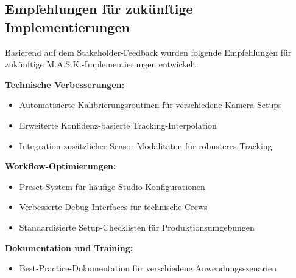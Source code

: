 \subsection{Empfehlungen für zukünftige Implementierungen}

Basierend auf dem Stakeholder-Feedback wurden folgende Empfehlungen für zukünftige M.A.S.K.-Implementierungen entwickelt:

\textbf{Technische Verbesserungen:}
\begin{itemize}
    \item Automatisierte Kalibrierungsroutinen für verschiedene Kamera-Setups
    \item Erweiterte Konfidenz-basierte Tracking-Interpolation
    \item Integration zusätzlicher Sensor-Modalitäten für robusteres Tracking
\end{itemize}

\textbf{Workflow-Optimierungen:}
\begin{itemize}
    \item Preset-System für häufige Studio-Konfigurationen
    \item Verbesserte Debug-Interfaces für technische Crews
    \item Standardisierte Setup-Checklisten für Produktionsumgebungen
\end{itemize}

\textbf{Dokumentation und Training:}
\begin{itemize}
    \item Best-Practice-Dokumentation für verschiedene Anwendungsszenarien
\end{itemize}
